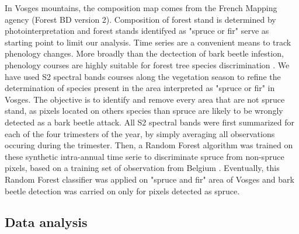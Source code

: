 \documentclass[3p,procedia]{elsarticle}
\begin{document}
In Vosges mountains, the composition map comes from the French Mapping agency (Forest BD version 2). 
Composition of forest stand is determined by photointerpretation and forest stands identifyed as "spruce or fir" serve as starting point to limit our analysis.
Time series are a convenient means to track phenology changes. 
More broadly than the dectection of bark beetle infestion, phenology courses are highly suitable for forest tree species discrimination \citep{lisein_discrimination_2015,grabska_forest_2019,ma_tree_2021}.
We have used S2 spectral bands courses along the vegetation season to refine the determination of species present in the area interpreted as "spruce or fir" in Vosges.
The objective is to identify and remove every area that are not spruce stand, as pixels located on others species than spruce are likely to be wrongly detected as a bark beetle attack.
All S2 spectral bands were first summarized for each of the four trimesters of the year, by simply averaging all observations occuring during the trimester.
Then, a Random Forest algorithm was trained on these synthetic intra-annual time serie to discriminate spruce from non-spruce pixels, based on a training set of observation from Belgium \citep{bolyn_forest_2018}.
Eventually, this Random Forest classifier was applied on "spruce and fir" area of Vosges and bark beetle detection was carried on only for pixels detected as spruce. 





\subsection{Data analysis}


\end{document}
